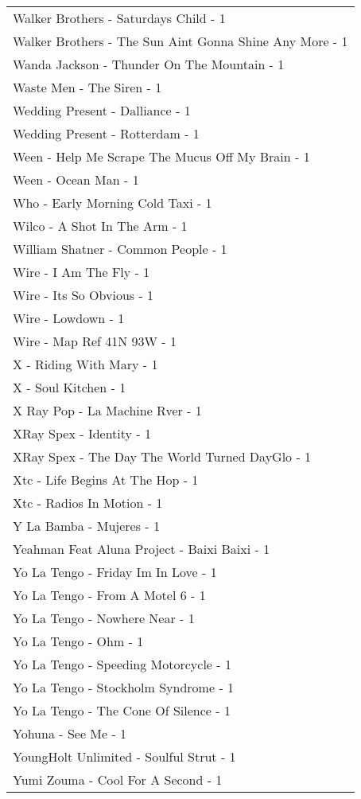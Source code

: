 \documentclass[
]{article}
\begin{document}
\begin{longtable}{l}
Walker Brothers - Saturdays Child - 1 \\ 
Walker Brothers - The Sun Aint Gonna Shine Any More - 1 \\ 
Wanda Jackson - Thunder On The Mountain - 1 \\ 
Waste Men - The Siren - 1 \\ 
Wedding Present - Dalliance - 1 \\ 
Wedding Present - Rotterdam - 1 \\ 
Ween - Help Me Scrape The Mucus Off My Brain - 1 \\ 
Ween - Ocean Man - 1 \\ 
Who - Early Morning Cold Taxi - 1 \\ 
Wilco - A Shot In The Arm - 1 \\ 
William Shatner - Common People - 1 \\ 
Wire - I Am The Fly - 1 \\ 
Wire - Its So Obvious - 1 \\ 
Wire - Lowdown - 1 \\ 
Wire - Map Ref 41N 93W - 1 \\ 
X - Riding With Mary - 1 \\ 
X - Soul Kitchen - 1 \\ 
X Ray Pop - La Machine Rver - 1 \\ 
XRay Spex - Identity - 1 \\ 
XRay Spex - The Day The World Turned DayGlo - 1 \\ 
Xtc - Life Begins At The Hop - 1 \\ 
Xtc - Radios In Motion - 1 \\ 
Y La Bamba - Mujeres - 1 \\ 
Yeahman Feat Aluna Project - Baixi Baixi - 1 \\ 
Yo La Tengo - Friday Im In Love - 1 \\ 
Yo La Tengo - From A Motel 6 - 1 \\ 
Yo La Tengo - Nowhere Near - 1 \\ 
Yo La Tengo - Ohm - 1 \\ 
Yo La Tengo - Speeding Motorcycle - 1 \\ 
Yo La Tengo - Stockholm Syndrome - 1 \\ 
Yo La Tengo - The Cone Of Silence - 1 \\ 
Yohuna - See Me - 1 \\ 
YoungHolt Unlimited - Soulful Strut - 1 \\ 
Yumi Zouma - Cool For A Second - 1 \\ 

\end{longtable}
\end{document}
